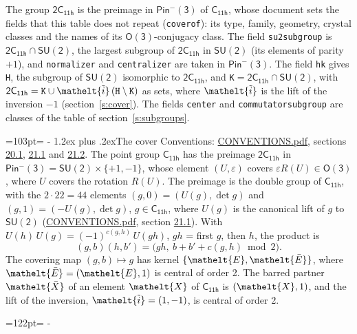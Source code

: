 \documentclass[10pt,a4paper]{article}
\makeatletter
\renewcommand\section{\@startsection{section}{1}{\z@}{-3ex plus -1ex minus -.2ex}%
  {1.2ex plus .2ex}{\normalfont\large\sffamily\bfseries\color{parttitle}}}
\newcommand{\needspace}[1]{\par\penalty-100\begingroup\dimen0=#1\relax\dimen2=\pagegoal
  \advance\dimen2-\pagetotal\ifdim\dimen0>\dimen2\relax\ifdim\dimen2>0pt\vfil\break\fi\fi
  \endgroup}
\numberwithin{equation}{section}
\newcommand{\eltfont}[1]{{\let\sigma\eltsigma\mathelt{#1}}}
\newcommand{\grp}[1]{\mathsf{#1}}
\newcommand{\elt}[1]{\eltfont{#1}}
\newcommand{\dirprod}{\times}
\newcommand{\barred}[1]{\bar{#1}}
\newcommand{\lift}[1]{\tilde{#1}}
\makeatother
\begin{document}
\leavevmode\label{n:element.inversion}\label{n:group.preimage}The group $\grp{2C_{11h}}$ is the preimage in $\grp{Pin^{-}(3)}$ of \href{../../../rotation/data/pdf/C11h.pdf}{$\grp{C_{11h}}$}, whose document sets the fields that this table does not repeat (\texttt{coverof}): its type, family, geometry, crystal classes and the names of its \href{../../../rotation/data/pdf/O3.pdf}{$\grp{O(3)}$}-conjugacy class. The field \texttt{su2subgroup} is $\grp{2C_{11h}} \cap \grp{SU(2)}$, the largest subgroup of $\grp{2C_{11h}}$ in $\grp{SU(2)}$ (its elements of parity $+1$), and \texttt{normalizer} and \texttt{centralizer} are taken in $\grp{Pin^{-}(3)}$. The field \texttt{hk} gives \texttt{H}, the subgroup of $\grp{SU(2)}$ isomorphic to $\grp{2C_{11h}}$, and \texttt{K}${} = \grp{2C_{11h}} \cap \grp{SU(2)}$, with $\grp{2C_{11h}} = \texttt{K} \cup \elt{\lift{i}}\,(\texttt{H} \setminus \texttt{K})$ as sets, where $\elt{\lift{i}}$ is the lift of the inversion $-1$ (section~\ref{s:cover}). The fields \texttt{center} and \texttt{commutatorsubgroup} are classes of the table of section~\ref{s:subgroups}.
\needspace{103pt}
\section{The cover}\label{s:cover}
Conventions: \href{../../CONVENTIONS.pdf}{CONVENTIONS.pdf}, sections \href{../../CONVENTIONS.pdf\#conv.20.1}{20.1}, \href{../../CONVENTIONS.pdf\#conv.21.1}{21.1} and \href{../../CONVENTIONS.pdf\#conv.21.2}{21.2}.
\leavevmode\label{n:group.pin.minus}\label{n:group.su2}\label{n:local.pin.sign}\label{n:matrix.covered}\label{n:matrix.lift.su2}\label{n:index.bar}The point group $\grp{C_{11h}}$ has the preimage $\grp{2C_{11h}}$ in $\grp{Pin^{-}(3)} = \grp{SU(2)} \dirprod \{+1, -1\}$, whose element $(U, \varepsilon)$ covers $\varepsilon R(U) \in \grp{O(3)}$, where $U$ covers the rotation $R(U)$. The preimage is the double group of $\grp{C_{11h}}$, with the $2 \cdot 22 = 44$ elements $(g, 0) = (U(g), \det g)$ and $(g, 1) = (-U(g), \det g)$, $g \in \grp{C_{11h}}$, where $U(g)$ is the canonical lift of $g$ to $\grp{SU(2)}$ (\href{../../CONVENTIONS.pdf}{CONVENTIONS.pdf}, section \href{../../CONVENTIONS.pdf\#conv.21.1}{21.1}). \label{n:function.cocycle}With $U(h)\,U(g) = (-1)^{c(g,h)}\,U(gh)$, $gh$ = first $g$, then $h$, the product is
\begin{equation}\label{e:product}(g, b)(h, b') = \bigl(gh,\ b + b' + c(g, h) \bmod 2\bigr).\end{equation}
\leavevmode\label{n:mark.bar}The covering map $(g, b) \mapsto g$ has kernel $\{\elt{E}, \elt{\barred{E}}\}$, where $\elt{\barred{E}} = (\elt{E}, 1)$ is central of order 2. \label{n:element.named}\label{n:mark.lift}The barred partner $\elt{\barred{X}}$ of an element $\elt{X}$ of $\grp{C_{11h}}$ is $(\elt{X}, 1)$, and the lift of the inversion, $\elt{\lift{i}} = (1, -1)$, is central of order 2.
\needspace{122pt}
\end{document}

